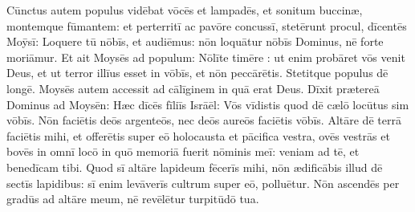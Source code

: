 Cūnctus autem populus
vidēbat vōcēs et lampadēs, et sonitum buccinæ, montemque
fūmantem: et perterritī ac pavōre concussī, stetērunt procul, 
dīcentēs
Moȳsī: Loquere tū nōbīs, et audiēmus: nōn loquātur nōbīs Dominus, nē
forte moriāmur. 
Et ait Moysēs ad populum: Nōlīte timēre
: ut enim probāret vōs venit Deus, et ut terror illīus
esset in vōbīs, et nōn peccārētis. 
Stetitque populus dē longē. Moysēs autem accessit ad
cālīginem in quā erat Deus. 
Dīxit prætereā Dominus ad
Moysēn: Hæc dīcēs fīliīs Isrāēl: Vōs
vīdistis quod dē cælō locūtus sim vōbīs. 
Nōn faciētis deōs argenteōs,
nec deōs aureōs faciētis vōbīs. 
Altāre dē terrā faciētis mihi, et
offerētis super eō holocausta et
pācifica vestra, ovēs vestrās et bovēs
in omnī locō in quō memoriā fuerit nōminis meī: veniam ad tē, et
benedīcam tibi. 
Quod sī altāre lapideum
fēcerīs mihi, nōn ædificābis illud dē sectīs lapidibus: sī
enim levāverīs cultrum super eō, polluētur. 
Nōn ascendēs
per gradūs ad altāre meum, nē revēlētur
turpitūdō tua.
